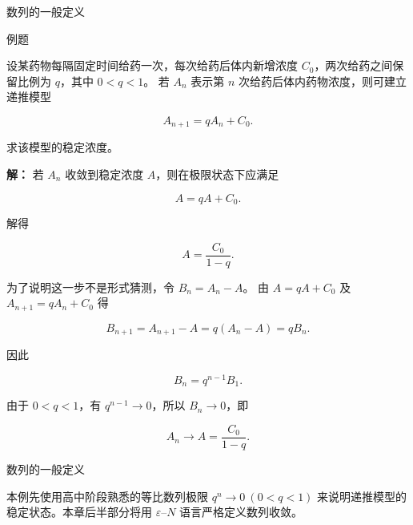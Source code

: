 \documentclass[aspectratio=169,10pt,fontset=fandol]{ctexbeamer}
\begin{document}
\begin{frame}[t,fragile]{数列的一般定义}
\normalsize
\begin{block}{例题}
{\normalsize
设某药物每隔固定时间给药一次，每次给药后体内新增浓度 $C_0$，两次给药之间保留比例为 $q$，其中 $0<q<1$。 若 $A_n$ 表示第 $n$ 次给药后体内药物浓度，则可建立递推模型

\[

A_{n+1}=qA_n+C_0.

\]

求该模型的稳定浓度。


}
\end{block}
\pause
{\normalsize
\textbf{解：}
若 $A_n$ 收敛到稳定浓度 $A$，则在极限状态下应满足

\[

A=qA+C_0.

\]

解得

\[

A=\frac{C_0}{1-q}.

\]

为了说明这一步不是形式猜测，令 $B_n=A_n-A$。 由 $A=qA+C_0$ 及 $A_{n+1}=qA_n+C_0$ 得

\[

B_{n+1}=A_{n+1}-A=q(A_n-A)=qB_n.

\]

因此

\[

B_n=q^{n-1}B_1.

\]

由于 $0<q<1$，有 $q^{n-1}\to0$，所以 $B_n\to0$，即

\[

A_n\to A=\frac{C_0}{1-q}.

\]


}
\end{frame}
\begin{frame}[t,fragile]{数列的一般定义}
\normalsize
{\normalsize
本例先使用高中阶段熟悉的等比数列极限 $q^n\to0\ (0<q<1)$ 来说明递推模型的稳定状态。本章后半部分将用 $\varepsilon$--$N$ 语言严格定义数列收敛。


}
\end{frame}
\end{document}
